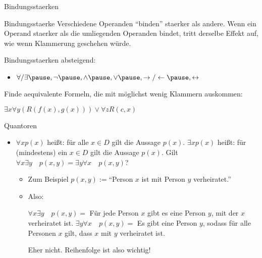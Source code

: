 \documentclass[]{beamer}
\begin{document}
\begin{frame}{Bindungsstaerken}
	\begin{block}{Bindungsstaerke}
		Verschiedene Operanden ``binden'' staerker als andere. \ip Wenn ein Operand staerker als die umliegenden Operanden bindet, tritt derselbe Effekt auf, wie wenn Klammerung geschehen würde.
	\end{block}

	\bp
	
	Bindungsstaerken absteigend:
	\begin{itemize}
		\ip \item $\forall / \exists\ip,\lnot\ip,\land\ip,\lor\ip,\rightarrow/\leftarrow\ip,\leftrightarrow$
	\end{itemize}

	\bp
	
	Finde aequivalente Formeln, die mit möglichst wenig Klammern auskommen:
	\begin{itemize}
        \pitem $\exists x \forall y (R(f(x), g(x))) \lor \forall z R(c, x)$ %
	\end{itemize}

\end{frame}
\begin{frame}{Quantoren}
\begin{itemize}
	\item $\forall x p(x)$ heißt\ip: für alle $x \in D$ gilt die Aussage $p(x)$.
	\pitem $\exists x p(x)$ heißt\ip: für (mindestens) ein $x \in D$ gilt die Aussage $p(x)$.
	\pitem Gilt $\forall x \exists y \quad p(x,y) = \exists y \forall x \quad p(x,y)$?
	\begin{itemize}
		\pause\item Zum Beispiel $p(x,y) := $``Person $x$ ist mit Person $y$ verheiratet.''
		\pause\item Also:
		\begin{itemize}
			\pitem $\forall x \exists y \quad p(x,y) = $ Für jede Person $x$ gibt es eine Person $y$, mit der $x$ verheiratet ist.
			\pitem $\exists y \forall x \quad p(x,y) = $ Es gibt eine Person $y$, sodass für alle Personen $x$ gilt, dass $x$ mit $y$ verheiratet ist.
		\end{itemize}
		\pitem Eher nicht. Reihenfolge ist also wichtig!
	\end{itemize}
\end{itemize}
\end{frame}
\end{document}

